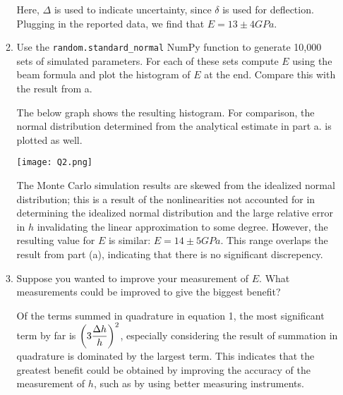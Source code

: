 \documentclass{article}
\begin{document}
\begin{enumerate}
\begin{enumerate}
Here, \(\Delta\) is used to indicate uncertainty, since \(\delta\) is used for deflection. Plugging in the reported data, we find that \(E = 13 \pm 4 \si{ GPa}\).

    \item Use the {\tt random.standard\_normal} NumPy function to generate 10,000 sets of simulated parameters. For each of these sets compute $E$ using the beam formula and plot the histogram of $E$ at the end. Compare this with the result from a.

The below graph shows the resulting histogram. For comparison, the normal distribution determined from the analytical estimate in part a. is plotted as well.

\texttt{[image: Q2.png]}

The Monte Carlo simulation results are skewed from the idealized normal distribution; this is a result of the nonlinearities not accounted for in determining the idealized normal distribution and the large relative error in $h$ invalidating the linear approximation to some degree. However, the resulting value for $E$ is similar: $E = 14 \pm 5 \si{ GPa}$. This range overlaps the result from part (a), indicating that there is no significant discrepency.

    \item Suppose you wanted to improve your measurement of $E$. What measurements could be improved to give the biggest benefit?

Of the terms summed in quadrature in equation 1, the most significant term by far is \( \displaystyle \reluncer[3]{h} \), especially considering the result of summation in quadrature is dominated by the largest term. This indicates that the greatest benefit could be obtained by improving the accuracy of the measurement of \(h\), such as by using better measuring instruments.


\end{enumerate}



\end{enumerate}
\end{document}

